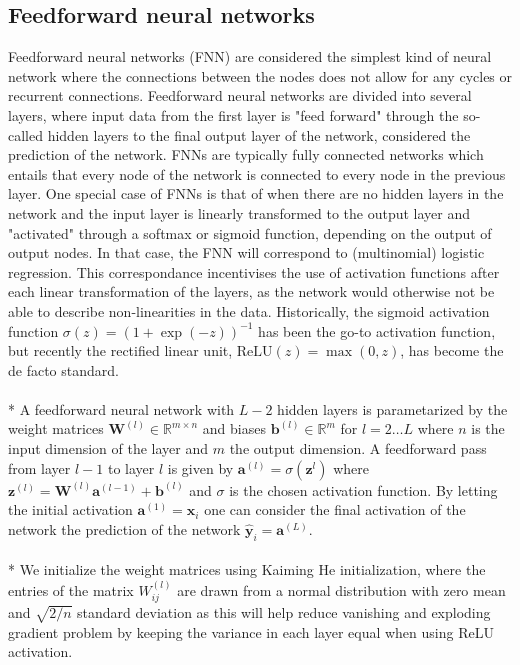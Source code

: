 \documentclass[a4paper,11pt]{article} %
\begin{document}
\subsection{Feedforward neural networks}
Feedforward neural networks (FNN) are considered the simplest kind of neural network where the connections between the nodes does not allow for any cycles or recurrent connections. Feedforward neural networks are divided into several layers, where input data from the first layer is "feed forward" through the so-called hidden layers to the final output layer of the network, considered the prediction of the network. FNNs are typically fully connected networks which entails that every node of the network is connected to every node in the previous layer. One special case of FNNs is that of when there are no hidden layers in the network and the input layer is linearly transformed to the output layer and "activated" through a softmax or sigmoid function, depending on the output of output nodes. In that case, the FNN will correspond to (multinomial) logistic regression. This correspondance incentivises the use of activation functions  after each linear transformation of the layers, as the network would otherwise not be able to describe non-linearities in the data. Historically, the sigmoid activation function $\sigma(z) = (1 + \exp(-z))^{-1}$ has been the go-to activation function, but recently the rectified linear unit, $\textrm{ReLU}(z) = \max(0, z)$, has become the de facto standard. \\
\\*
A feedforward neural network with $L-2$ hidden layers is parametarized by the weight matrices $\mathbf{W}^{(l)} \in \mathbb{R}^{m \times n}$ and biases $\mathbf{b}^{(l)} \in  \mathbb{R}^{m}$ for $l = 2 \ldots L$ where $n$ is the input dimension of the layer and $m$ the output dimension. A feedforward pass from layer $l-1$ to layer $l$ is given by $\mathbf{a}^{(l)} = \sigma(\mathbf{z}^{l})$ where $\mathbf{z}^{(l)} = \mathbf{W}^{(l)} \mathbf{a}^{(l-1)} + \mathbf{b}^{(l)}$ and $\sigma$ is the chosen activation function. By letting the initial activation $\mathbf{a}^{(1)} = \mathbf{x}_i$ one can consider the final activation of the network the prediction of the network $\mathbf{\hat{y}}_i = \mathbf{a}^{(L)}$. \\
\\*
We initialize the weight matrices using Kaiming He initialization, where the entries of the matrix $W^{(l)}_{ij}$ are drawn from a normal distribution with zero mean and $\sqrt{2/n}$ standard deviation as this will help reduce vanishing and exploding gradient problem by keeping the variance in each layer equal when using ReLU activation. \cite{he2015delving}
\end{document}
